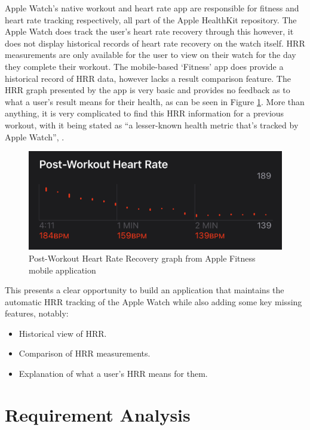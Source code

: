 \documentclass{l4proj}
\begin{document}
Apple Watch’s native workout and heart rate app are responsible for fitness and heart rate tracking respectively, all part of the Apple HealthKit repository. The Apple Watch does track the user’s heart rate recovery through this however, it does not display historical records of heart rate recovery on the watch itself. HRR measurements are only available for the user to view on their watch for the day they complete their workout. The mobile-based ‘Fitness’ app does provide a historical record of HRR data, however lacks a result comparison feature. The HRR graph presented by the app is very basic and provides no feedback as to what a user’s result means for their health, as can be seen in Figure \ref{fig:applehrr}. More than anything, it is very complicated to find this HRR information for a previous workout, with it being stated as “a lesser-known health metric that’s tracked by Apple Watch”, \cite{AppleHRR}.

\begin{figure}[h!]
    \centering
    \includegraphics[width=0.6\linewidth]{dissertation//dissImages/AppleWatchHRR.png}
    \caption{Post-Workout Heart Rate Recovery graph from Apple Fitness mobile application}
    \label{fig:applehrr}
\end{figure}

This presents a clear opportunity to build an application that maintains the automatic HRR tracking of the Apple Watch while also adding some key missing features, notably:

\begin{itemize}
    \item Historical view of HRR.
    \item Comparison of HRR measurements.
    \item Explanation of what a user’s HRR means for them.
\end{itemize}

\chapter{Requirement Analysis}
\label{sec:requirements}
\end{document}
